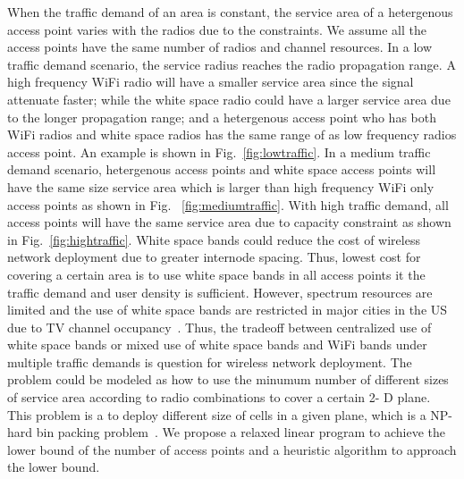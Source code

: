 When the traffic demand of an area is constant, the service area of a hetergenous access point 
varies with the radios due to the constraints. We assume all the access points have the same number of radios and channel 
resources.
In a low traffic demand scenario, the service radius reaches the radio propagation range.
A high frequency WiFi radio will have a smaller service area since the signal attenuate faster; while the white
space radio could have a larger service area due to the longer propagation range; and a hetergenous access point who has
both WiFi radios and white space radios has the same range of as low frequency radios access point. An example is
shown in Fig.~\ref{fig:lowtraffic}.
In a medium traffic demand scenario, hetergenous access points and white space access points will 
have the same size service area which is larger than high frequency WiFi only access points as shown in Fig.
~\ref{fig:mediumtraffic}.
With high traffic demand, all access points will have the same service area due to capacity constraint 
as shown in Fig.~\ref{fig:hightraffic}. White space bands could reduce the cost of wireless network 
deployment due to greater internode spacing. 
Thus, lowest cost for covering a certain area is to use white space bands in all access points 
it the traffic demand and user density is sufficient. 
However, spectrum resources are limited and the use of white space bands 
are restricted in major cities in the US due to TV channel occupancy~\cite{msdatabase}. 
Thus, the tradeoff between centralized use of  white space bands or mixed use of white space
bands and WiFi bands under multiple traffic demands is question for wireless network deployment. The problem
could be modeled as how to use the minumum number of different sizes of service area according to 
radio combinations to cover a certain 2- D plane. This problem is a to deploy different size of cells in 
a given plane, which is a NP-hard bin packing problem~\cite{martello1998exact}. We propose a relaxed 
linear program to achieve the lower bound of the number of access points and a heuristic algorithm to 
approach the lower bound.



